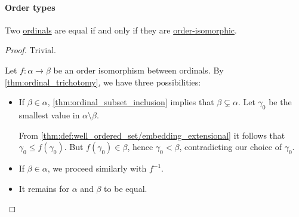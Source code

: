 \paragraph{Order types}

\begin{lemma}\label{thm:ordinal_isomorphism}
  Two \hyperref[def:ordinal]{ordinals} are equal if and only if they are \hyperref[def:partially_ordered_set/morphism]{order-isomorphic}.
\end{lemma}
\begin{proof}
  \SufficiencySubProof Trivial.

  \NecessitySubProof Let \( f: \alpha \to \beta \) be an order isomorphism between ordinals. By \cref{thm:ordinal_trichotomy}, we have three possibilities:
  \begin{itemize}
    \item If \( \beta \in \alpha \), \cref{thm:ordinal_subset_inclusion} implies that \( \beta \subsetneq \alpha \). Let \( \gamma_0 \) be the smallest value in \( \alpha \setminus \beta \).

    From \cref{thm:def:well_ordered_set/embedding_extensional} it follows that \( \gamma_0 \leq f(\gamma_0) \). But \( f(\gamma_0) \in \beta \), hence \( \gamma_0 < \beta \), contradicting our choice of \( \gamma_0 \).

    \item If \( \beta \in \alpha \), we proceed similarly with \( f^{-1} \).

    \item It remains for \( \alpha \) and \( \beta \) to be equal.
  \end{itemize}
\end{proof}


